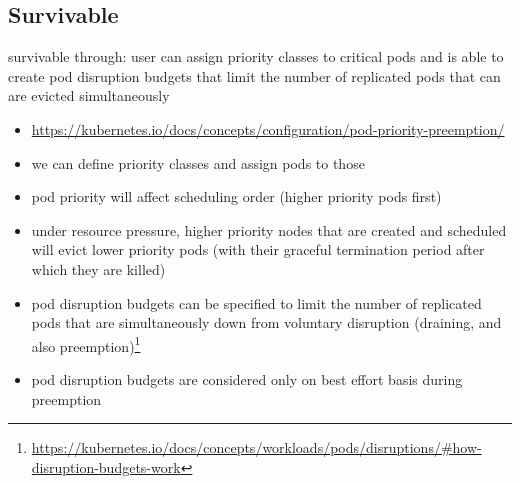 \subsection{Survivable}\label{sec:self-healing-kubernetes:survivable}
  survivable through: user can assign priority classes to critical pods and is able to create pod disruption budgets that limit the number of replicated pods that can are evicted simultaneously
  \begin{itemize}
    \item \url{https://kubernetes.io/docs/concepts/configuration/pod-priority-preemption/}
    \item we can define priority classes and assign pods to those
    \item pod priority will affect scheduling order (higher priority pods first)
    \item under resource pressure, higher priority nodes that are created and scheduled will evict lower priority pods (with their graceful termination period after which they are killed)
    \item pod disruption budgets can be specified to limit the number of replicated pods that are simultaneously down from voluntary disruption (draining, and also preemption)\footnote{\url{https://kubernetes.io/docs/concepts/workloads/pods/disruptions/\#how-disruption-budgets-work}}
    \item pod disruption budgets are considered only on best effort basis during preemption
  \end{itemize}

